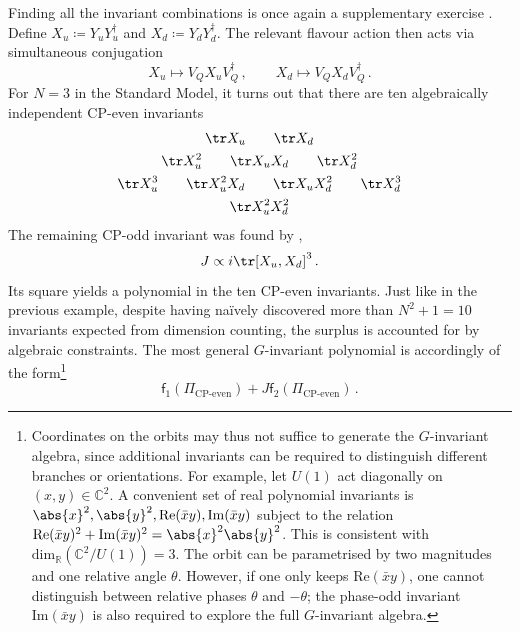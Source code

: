 \documentclass[12pt]{article}
\numberwithin{equation}{section}
\newcommand{\R}{\mathbb{R}}
\newcommand{\C}{\mathbb{C}}
\begin{document}
Finding all the invariant combinations is once again a supplementary exercise \citep[see][Section~5]{Jenkins2009}. Define ${X_u\coloneqq Y_uY_u^\dagger}$ and ${X_d\coloneqq Y_dY_d^\dagger}$. The relevant flavour action then acts via simultaneous conjugation
\begin{equation}
    X_u\longmapsto V_QX_u V_Q^\dagger\,,\qquad X_d\longmapsto V_QX_d V_Q^\dagger\,. 
\end{equation}
For $N=3$ in the Standard Model, it turns out that there are ten algebraically independent CP-even invariants 
\begin{equation}
\begin{gathered}
    \tr X_u \qquad \tr X_d\\
    \tr X_u^2 \qquad \tr X_uX_d \qquad \tr X_d^2\\
    \tr X_u^3 \qquad \tr X_u^2X_d \qquad \tr X_uX_d^2 \qquad \tr X_d^3\\
    \tr X_u^2X_d^2
\end{gathered}
\end{equation}
The remaining CP-odd invariant was found by \citet{Jarlskog1985},
\begin{equation}
    J\propto i\tr [X_u,X_d]^3\,.
\end{equation}
Its square yields a polynomial in the ten CP-even invariants. Just like in the previous example, despite having na\"ively discovered more than ${N^2+1=10}$ invariants expected from dimension counting, the surplus is accounted for by algebraic constraints. The most general $G$-invariant polynomial is accordingly of the form\footnote{\label{footnote:syzygies}Coordinates on the orbits may thus not suffice to generate the $G$-invariant algebra, since additional invariants can be required to distinguish different branches or orientations. For example, let $U(1)$ act diagonally on $(x,y)\in\C^2$. A convenient set of real polynomial invariants is $\abs{x}^2,\abs{y}^2, \mathrm{Re}(\bar{x}y),\mathrm{Im}(\bar{x}y)$ subject to the relation $\mathrm{Re}(\bar{x}y)^2+\mathrm{Im}(\bar{x}y)^2 = \abs{x}^2\abs{y}^2$. This is consistent with $\mathrm{dim}_\R(\C^2\slash U(1))=3$. The orbit can be parametrised by two magnitudes and one relative angle $\theta$. However, if one only keeps $\mathrm{Re}(\bar{x}y)$, one cannot distinguish between relative phases $\theta$ and $-\theta$; the phase-odd invariant $\mathrm{Im}(\bar{x}y)$ is also required to explore the full $G$-invariant algebra.}
\begin{equation}
    \mathsf{f}_1(\Pi_\text{CP-even}) + J\mathsf{f}_2(\Pi_\text{CP-even})\,.
\end{equation}
\end{document}
